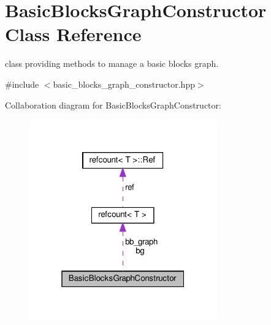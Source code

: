 \hypertarget{classBasicBlocksGraphConstructor}{}\section{Basic\+Blocks\+Graph\+Constructor Class Reference}
\label{classBasicBlocksGraphConstructor}


class providing methods to manage a basic blocks graph.  




{\ttfamily \#include $<$basic\+\_\+blocks\+\_\+graph\+\_\+constructor.\+hpp$>$}



Collaboration diagram for Basic\+Blocks\+Graph\+Constructor\+:
\nopagebreak
\begin{figure}[H]
\begin{center}
\leavevmode
\includegraphics[width=229pt]{d8/df8/classBasicBlocksGraphConstructor__coll__graph}
\end{center}
\end{figure}
